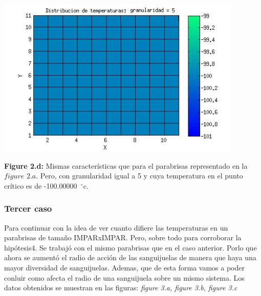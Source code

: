 \includegraphics[width=\textwidth,height=3.0in,keepaspectratio
]{45x45h5.jpg} \newline
\begin {flushleft}
\textbf{Figure 2.d:} Mismas características que para el parabrisas representado en la $figure$ $2.a$. Pero, con granularidad igual a 5 y cuya temperatura en el punto crítico es de -100.00000\hspace{-1.5mm}$\phantom{a}^{\circ}$c.
\end{flushleft}


\subsubsection{Tercer caso}


Para continuar con la idea de ver cuanto difiere las temperaturas en un parabrisas de tamaño IMPARxIMPAR. Pero, sobre todo para corroborar la hipótesis4. Se trabajó con el mismo parabrisas que en el caso anterior. Porlo que ahora se aumentó el radio de acción de las sanguijuelas de manera que haya una mayor diversidad de sanguijuelas. Ademas, que de esta forma vamos a poder conluir como afecta el radio de una sanguijuela sobre un mismo sistema. Los datos obtenidos se muestran en las figuras: \textit{figure 3.a, figure 3.b, figure 3.c}  \newline


